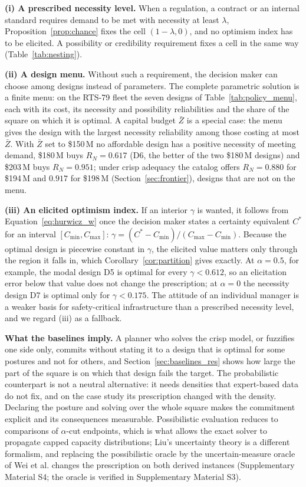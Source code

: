 \documentclass[Review,sagev,times]{sagej}%
\begin{document}
\textbf{(i) A prescribed necessity level.} When a regulation, a contract or an internal standard requires demand
to be met with necessity at least $\lambda$, Proposition~\ref{prop:chance} fixes the cell $(1-\lambda,0)$, and no
optimism index has to be elicited. A possibility or credibility requirement fixes a cell in the same way
(Table~\ref{tab:nesting}).

\textbf{(ii) A design menu.} Without such a requirement, the decision maker can choose among designs instead of
parameters. The complete parametric solution is a finite menu: on the RTS-79 fleet the seven designs of
Table~\ref{tab:policy_menu}, each with its cost, its necessity and possibility reliabilities and the share of
the square on which it is optimal. A capital budget $\bar{Z}$ is a special case: the menu gives the design with
the largest necessity reliability among those costing at most $\bar{Z}$. With $\bar{Z}$ set to \$150\,M no
affordable design has a positive necessity of meeting demand, \$180\,M buys $R_N = 0.617$ (D6, the better of the
two \$180\,M designs) and \$203\,M buys $R_N = 0.951$; under crisp adequacy the catalog offers $R_N = 0.880$ for
\$194\,M and $0.917$ for \$198\,M (Section~\ref{sec:frontier}), designs that are not on the menu.

\textbf{(iii) An elicited optimism index.} If an interior $\gamma$ is wanted, it follows from
Equation~\eqref{eq:hurwicz_w} once the decision maker states a certainty equivalent $C^*$ for an interval
$[C_{\min},C_{\max}]$: $\gamma = (C^*-C_{\min})/(C_{\max}-C_{\min})$. Because the optimal design is piecewise
constant in $\gamma$, the elicited value matters only through the region it falls in, which
Corollary~\ref{cor:partition} gives exactly. At $\alpha=0.5$, for example, the modal design D5 is optimal for
every $\gamma<0.612$, so an elicitation error below that value does not change the prescription; at $\alpha=0$
the necessity design D7 is optimal only for $\gamma<0.175$. The attitude of an individual manager is a weaker
basis for safety-critical infrastructure than a prescribed necessity level, and we regard (iii) as a fallback.

\textbf{What the baselines imply.} A planner who solves the crisp model, or fuzzifies one side only, commits
without stating it to a design that is optimal for some postures and not for others, and Section~\ref{sec:baselines_res}
shows how large the part of the square is on which that design fails the target. The probabilistic counterpart
is not a neutral alternative: it needs densities that expert-based data do not fix, and on the case study its
prescription changed with the density. Declaring the posture and solving over the whole square makes the
commitment explicit and its consequences measurable. Possibilistic evaluation reduces to comparisons of
$\alpha$-cut endpoints, which is what allows the exact solver to propagate capped capacity distributions; Liu's
uncertainty theory\cite{Liu2015} is a different formalism, and replacing the possibilistic oracle by the
uncertain-measure oracle of Wei et al.\cite{WeiShiZhang2025a} changes the prescription on both derived
instances (Supplementary Material S4; the oracle is verified in Supplementary Material S3).
\end{document}
